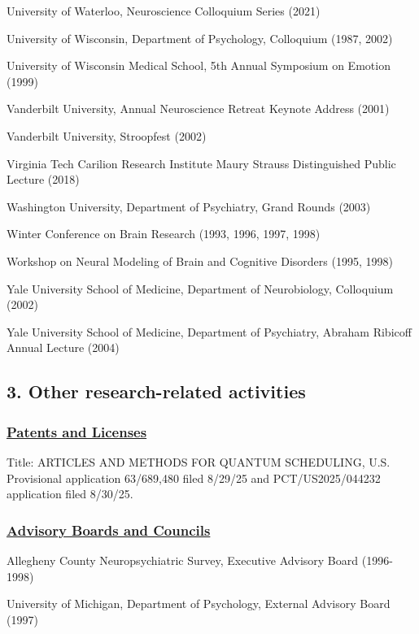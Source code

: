 \documentclass[10 pt]{article}
\begin{document}
University of Waterloo, Neuroscience Colloquium Series (2021)

University of Wisconsin, Department of Psychology, Colloquium (1987, 2002)

University of Wisconsin Medical School, 5th Annual Symposium on Emotion (1999)

Vanderbilt University, Annual Neuroscience Retreat Keynote Address (2001)

Vanderbilt University, Stroopfest (2002)

Virginia Tech Carilion Research Institute Maury Strauss Distinguished Public Lecture (2018)

Washington University, Department of Psychiatry, Grand Rounds (2003)

Winter Conference on Brain Research (1993, 1996, 1997, 1998)

Workshop on Neural Modeling of Brain and Cognitive Disorders (1995, 1998)

Yale University School of Medicine, Department of Neurobiology, Colloquium (2002)

Yale University School of Medicine, Department of Psychiatry, Abraham Ribicoff Annual Lecture (2004)


\subsection*{3. Other research-related activities} \label{secRAPA3}
    \smallskip

\subsubsection*{\underline{Patents and Licenses}} \label{secPaL}
    \smallskip

Title: ARTICLES AND METHODS FOR QUANTUM SCHEDULING, U.S. Provisional application 63/689,480 filed 8/29/25 and PCT/US2025/044232 application filed 8/30/25.


\subsubsection*{\underline{Advisory Boards and Councils}} \label{secABaC}
    \smallskip

Allegheny County Neuropsychiatric Survey, Executive Advisory Board (1996-1998)

University of Michigan, Department of Psychology, External Advisory Board (1997)
\end{document}

